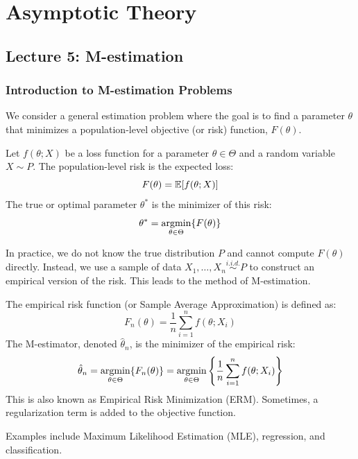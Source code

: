 \chapter{Asymptotic Theory}

\section{Lecture 5: M-estimation}
\subsection{Introduction to M-estimation Problems}
We consider a general estimation problem where the goal is to find a parameter $\theta$ that minimizes a population-level objective (or risk) function, $F(\theta)$.

\begin{de}
Let $f(\theta; X)$ be a loss function for a parameter $\theta \in \Theta$ and a random variable $X \sim P$. The population-level risk is the expected loss:
$$ F(\theta) = \mathbb{E}[f(\theta; X)] $$
The true or optimal parameter $\theta^*$ is the minimizer of this risk:
$$ \theta^* = \argmin_{\theta \in \Theta} \{F(\theta)\} $$
\end{de}

In practice, we do not know the true distribution $P$ and cannot compute $F(\theta)$ directly. Instead, we use a sample of data $X_1, \dots, X_n \stackrel{i.i.d.}{\sim} P$ to construct an empirical version of the risk. This leads to the method of M-estimation.

\begin{de}
The empirical risk function (or Sample Average Approximation) is defined as:
$$ F_n(\theta) = \frac{1}{n} \sum_{i=1}^n f(\theta; X_i) $$
The M-estimator, denoted $\hat{\theta}_n$, is the minimizer of the empirical risk:
$$ \hat{\theta}_n = \argmin_{\theta \in \Theta} \{F_n(\theta)\} = \argmin_{\theta \in \Theta} \left\{ \frac{1}{n} \sum_{i=1}^n f(\theta; X_i) \right\} $$
This is also known as Empirical Risk Minimization (ERM). Sometimes, a regularization term is added to the objective function. 
\end{de}

\begin{remark}
    Examples include Maximum Likelihood Estimation (MLE), regression, and classification.
\end{remark}

